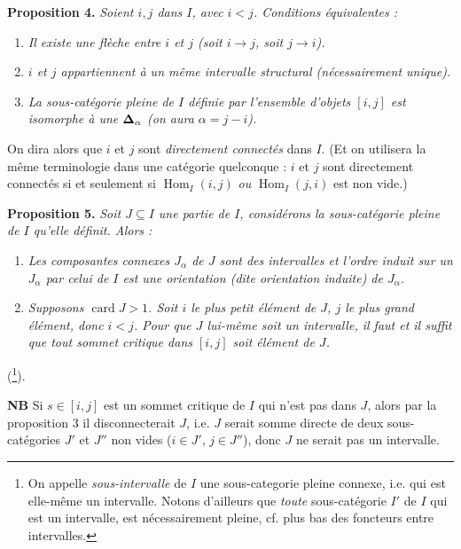\textbf{Proposition 4.} \textit{Soient $i,j$ dans $I$, avec $i < j$. Conditions équivalentes :}
\begin{enumerate}
\item[\textit{a)}] \textit{Il existe une flèche entre $i$ et $j$ (soit $i \longrightarrow j$, soit $j \longrightarrow i$).}
\item[\textit{b)}] \textit{$i$ et $j$ appartiennent à un même intervalle structural (nécessairement unique).}
\item[\textit{c)}] \textit{La sous-catégorie pleine de $I$ définie par l'ensemble d'objets $[i,j]$ est isomorphe à une $\boldsymbol{\Delta}_\alpha$ (on aura $\alpha = j-i$).}
\end{enumerate}

On dira alors que $i$ et $j$ sont \textit{directement connectés} dans $I$. (Et on utilisera la même terminologie dans une catégorie quelconque : $i$ et $j$ sont directement connectés si et seulement si $\operatorname{Hom}_I(i,j)$ \textit{ou} $\operatorname{Hom}_I(j,i)$ est non vide.)

\textbf{Proposition 5.} \textit{Soit $J \subseteq I$ une partie de $I$, considérons la sous-catégorie pleine de $I$ qu'elle définit. Alors :}
\begin{enumerate}
\item[\textit{a)}] \textit{Les composantes connexes $J_\alpha$ de $J$ sont des intervalles et l'ordre induit sur un $J_\alpha$ par celui de $I$ est une orientation (dite \textup{orientation induite}) de $J_\alpha$.}
\item[\textit{b)}] \textit{Supposons $\operatorname{card} J > 1$. Soit $i$ le plus petit élément de $J$, $j$ le plus grand élément, donc $i < j$. Pour que $J$ lui-même soit un intervalle, il faut et il suffit que tout sommet critique dans $[i,j]$ soit élément de $J$.}
\end{enumerate}

(\footnote[4]{On appelle \textit{sous-intervalle} de $I$ une sous-categorie %
pleine connexe, i.e. qui est elle-même un intervalle. Notons d'ailleurs que \textit{toute} sous-catégorie $I'$ de $I$ qui est un intervalle, est nécessairement pleine, cf. plus bas des foncteurs entre intervalles.}).

\textbf{NB} Si $s \in [i,j]$ est un sommet critique de $I$ qui n'est pas dans $J$, alors par la proposition 3 il disconnecterait $J$, i.e. $J$ serait somme directe de deux sous-catégories $J'$ et $J''$ non vides ($i \in J'$, $j \in J''$), donc $J$ ne serait pas un intervalle.

